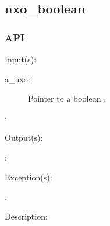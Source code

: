 %
%
%
%
%              

\subsection{nxo\_boolean}
\label{nxo_boolean}

\subsubsection{API}
\begin{capi}
\label{nxo_boolean_}
	\begin{capilist}
	\item[Input(s): ]
		\begin{description}\item[]
		\item[a\_nxo: ]
			Pointer to a boolean .
		\item[: ]
		\end{description}
	\item[Output(s): ]
		\begin{description}\item[]
		\item[: ]
		\end{description}
	\item[Exception(s): ]
		\begin{description}\item[]
		\item[.]
		\end{description}
	\item[Description: ]
	\end{capilist}
\end{capi}
